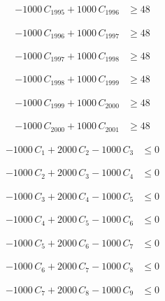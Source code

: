 \documentclass[a4paper,11pt]{article}
\begin{document}
\begin{align}
-1000\,C_{1995} + 1000\,C_{1996} &\geq 48 \nonumber
\end{align}

\begin{align}
-1000\,C_{1996} + 1000\,C_{1997} &\geq 48 \nonumber
\end{align}

\begin{align}
-1000\,C_{1997} + 1000\,C_{1998} &\geq 48 \nonumber
\end{align}

\begin{align}
-1000\,C_{1998} + 1000\,C_{1999} &\geq 48 \nonumber
\end{align}

\begin{align}
-1000\,C_{1999} + 1000\,C_{2000} &\geq 48 \nonumber
\end{align}

\begin{align}
-1000\,C_{2000} + 1000\,C_{2001} &\geq 48 \nonumber
\end{align}

\begin{align}
-1000\,C_{1} + 2000\,C_{2} - 1000\,C_{3} &\leq 0 \nonumber
\end{align}

\begin{align}
-1000\,C_{2} + 2000\,C_{3} - 1000\,C_{4} &\leq 0 \nonumber
\end{align}

\begin{align}
-1000\,C_{3} + 2000\,C_{4} - 1000\,C_{5} &\leq 0 \nonumber
\end{align}

\begin{align}
-1000\,C_{4} + 2000\,C_{5} - 1000\,C_{6} &\leq 0 \nonumber
\end{align}

\begin{align}
-1000\,C_{5} + 2000\,C_{6} - 1000\,C_{7} &\leq 0 \nonumber
\end{align}

\begin{align}
-1000\,C_{6} + 2000\,C_{7} - 1000\,C_{8} &\leq 0 \nonumber
\end{align}

\begin{align}
-1000\,C_{7} + 2000\,C_{8} - 1000\,C_{9} &\leq 0 \nonumber
\end{align}
\end{document}
